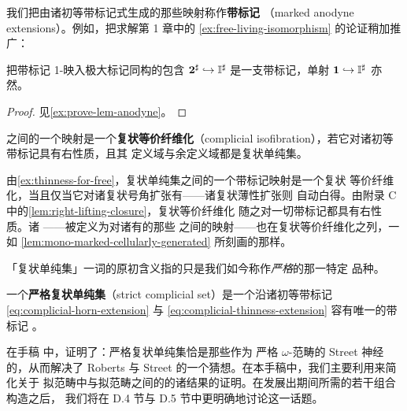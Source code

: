 我们把由诸初等带标记\trAnodyneExtension\trCell{}式生成的那些映射称作\textbf{带标记%
\trAnodyneExtension}（marked anodyne extensions）。例如，把求解第 1 章中的%
\cref{ex:free-living-isomorphism} 的论证稍加推广：

\begin{lemma}\label{lem:marked-anodyne-free-isomorphism}
把带标记 1-\trSimplex{}映入极大标记同构的包含
$\mathbf{2}^{\sharp}\hookrightarrow\mathbb{I}^{\sharp}$ 是一支带标记\trAnodyneExtension，单射
$\mathbf{1}\hookrightarrow\mathbb{I}^{\sharp}$ 亦然。
\end{lemma}

\begin{proof}
见\cref{ex:prove-lem-anodyne}。
\end{proof}

\begin{definition}\label{def:complicial-isofibration}
\trMarkedSimplicialSet{}之间的一个映射是一个\textbf{复状等价纤维化}（complicial
isofibration），若它对诸初等带标记\trAnodyneExtension{}具有右\trLifting{}性质，且其
定义域与余定义域都是复状单纯集。
\end{definition}

由\cref{ex:thinness-for-free}，复状单纯集之间的一个带标记映射是一个复状
等价纤维化，当且仅当它对诸复状号角扩张有\trLifting——诸复状薄性扩张则
自动白得。由附录 C 中的\cref{lem:right-lifting-closure}，复状等价纤维化
随之对一切带标记\trAnodyneExtension{}都具有右\trLifting{}性质。诸\textbf{%
\trTrivialFibration}——被定义为对诸\trMonomorphism{}有\trLifting{}的那些%
\trMarkedSimplicialSet{}之间的映射——也在复状等价纤维化之列，一如%
\cref{lem:mono-marked-cellularly-generated} 所刻画的那样。

「复状单纯集」一词的原初含义指的只是我们如今称作\emph{严格}的那一特定
品种。

\begin{definition}\label{def:strict-complicial-set}
一个\textbf{严格复状单纯集}（strict complicial set）是一个沿诸初等带标记%
\trAnodyneExtension \eqref{eq:complicial-horn-extension} 与
\eqref{eq:complicial-thinness-extension} 容有唯一\trExtension{}的带标记%
\trSimplicialSet{}。
\end{definition}

在手稿 \cite{bib128} 中，\trVerity{}证明了：严格复状单纯集恰是那些作为
严格 $\omega$-范畴的 Street 神经的\trMarkedSimplicialSet{}，从而解决了 Roberts 与
Street 的一个猜想。在本手稿中，我们主要利用\trMarkedSimplicialSet{}来简化关于
拟范畴中\trIsomorphism{}与拟范畴之间的\trEquivalence{}的诸结果的证明。在发展出期间所需的若干组合构造之后，
我们将在 D.4 节与 D.5 节中更明确地讨论这一话题。

